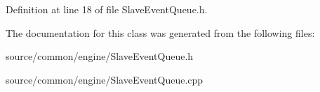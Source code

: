 Definition at line 18 of file Slave\-Event\-Queue.\-h.



The documentation for this class was generated from the following files\-:\begin{DoxyCompactItemize}
\item 
source/common/engine/Slave\-Event\-Queue.\-h\item 
source/common/engine/Slave\-Event\-Queue.\-cpp\end{DoxyCompactItemize}

